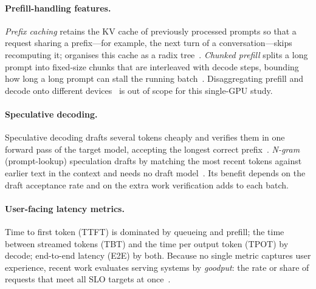 \paragraph{Prefill-handling features.}
\emph{Prefix caching} retains the KV cache of previously processed prompts so that a request
sharing a prefix---for example, the next turn of a conversation---skips recomputing it;
\sglang organises this cache as a radix tree~\cite{zheng2024sglang}. \emph{Chunked prefill}
splits a long prompt into fixed-size chunks that are interleaved with decode steps, bounding
how long a long prompt can stall the running batch~\cite{agrawal2024sarathi}.
Disaggregating prefill and decode onto different devices~\cite{zhong2024distserve,patel2024splitwise}
is out of scope for this single-GPU study.

\paragraph{Speculative decoding.}
Speculative decoding drafts several tokens cheaply and verifies them in one forward pass of
the target model, accepting the longest correct prefix~\cite{leviathan2023spec,chen2023specsampling}.
\emph{N-gram} (prompt-lookup) speculation drafts by matching the most recent tokens against
earlier text in the context and needs no draft model~\cite{saxena2023pld}. Its benefit depends
on the draft acceptance rate and on the extra work verification adds to each batch.

\paragraph{User-facing latency metrics.}
Time to first token (TTFT) is dominated by queueing and prefill; the time between streamed
tokens (TBT) and the time per output token (TPOT) by decode; end-to-end latency (E2E) by both.
Because no single metric captures user experience, recent work evaluates serving systems by
\emph{goodput}: the rate or share of requests that meet all SLO targets at
once~\cite{zhong2024distserve}.
